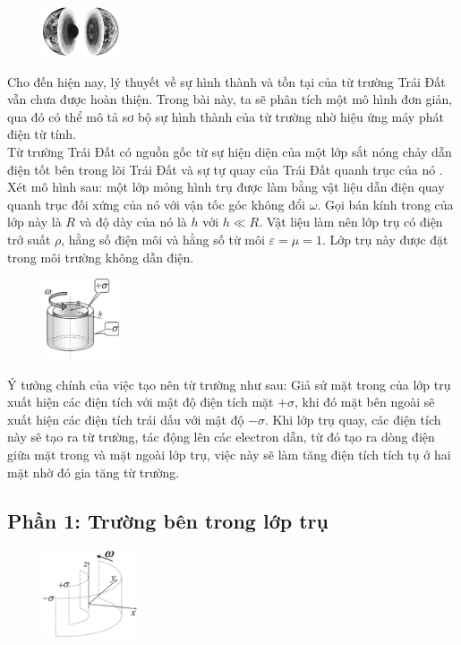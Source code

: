 \begin{figure}
  \centering
  \vspace{-5mm}
  \includegraphics[width=0.2\textwidth]{Figures/P2/Fig 2.1.png}
\end{figure}

\noindent Cho đến hiện nay, lý thuyết về sự hình thành và tồn tại của từ trường Trái Đất vẫn chưa được hoàn thiện. Trong bài này, ta sẽ phân tích một mô hình đơn giản, qua đó có thể mô tả sơ bộ sự hình thành của từ trường nhờ hiệu ứng máy phát điện từ tính.\\
\indent Từ trường Trái Đất có nguồn gốc từ sự hiện diện của một lớp sắt nóng chảy dẫn điện tốt bên trong lõi Trái Đất và sự tự quay của Trái Đất quanh trục của nó . Xét mô hình sau: một lớp mỏng hình trụ được làm bằng vật liệu dẫn điện quay quanh trục đối xứng của nó với vận tốc góc không đổi $\omega$. Gọi bán kính trong của lớp này là $R$ và độ dày của nó là $h$ với $h\ll R$. Vật liệu làm nên lớp trụ có điện trở suất $\rho$, hằng số điện môi và hằng số từ môi $\varepsilon=\mu=1$. Lớp trụ này được đặt trong môi trường không dẫn điện.\\
\begin{figure}
  \centering
  \vspace{-0.6cm}
  \includegraphics[width=0.2\textwidth]{Figures/P2/Fig 2.2.png}
\end{figure}

\vspace{-0.4cm}
\indent Ý tưởng chính của việc tạo nên từ trường như sau: Giả sử mặt trong của lớp trụ xuất hiện các điện tích với mật độ điện tích mặt $+\sigma$, khi đó mặt bên ngoài sẽ xuất hiện các điện tích trái dấu với mật độ $-\sigma$. Khi lớp trụ quay, các điện tích này sẽ tạo ra từ trường, tác động lên các electron dẫn, từ đó tạo ra dòng điện giữa mặt trong và mặt ngoài lớp trụ, việc này sẽ làm tăng điện tích tích tụ ở hai mặt nhờ đó gia tăng từ trường.
\subsection*{Phần 1: Trường bên trong lớp trụ}
\begin{figure}
  \centering
  \vspace{-0.6cm}
  \includegraphics[width=0.25\textwidth]{Figures/P2/Fig 2.3.png}
\end{figure}

